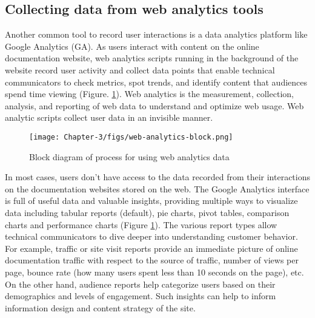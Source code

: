 \subsection{Collecting data from web analytics tools}
Another common tool to record user interactions is a data analytics platform like Google Analytics (GA). As users interact with content on the online documentation website, web analytics scripts running in the background of the website record user activity and collect data points that enable technical communicators to check metrics, spot trends, and identify content that audiences spend time viewing (Figure. \ref{fig:ch3.3}). Web analytics is the measurement, collection, analysis, and reporting of web data to understand and optimize web usage. Web analytic scripts collect user data in an invisible manner.

\begin{figure}[t]
  \begin{center}
      \texttt{[image: Chapter-3/figs/web-analytics-block.png]}
  \end{center}
  \caption{Block diagram of process for using web analytics data}
  \label{fig:ch3.3}
\end{figure}

In most cases, users don't have access to the data recorded from their interactions on the documentation websites stored on the web. The Google Analytics interface is full of useful data and valuable insights, providing multiple ways to visualize data including tabular reports (default), pie charts, pivot tables, comparison charts and performance charts (Figure \ref{fig:ch3.3}). The various report types allow technical communicators to dive deeper into understanding customer behavior. For example, traffic or site visit reports provide an immediate picture of online documentation traffic with respect to the source of traffic, number of views per page, bounce rate (how many users spent less than 10 seconds on the page), etc. On the other hand, audience reports help categorize users based on their demographics and levels of engagement. Such insights can help to inform information design and content strategy of the site.


